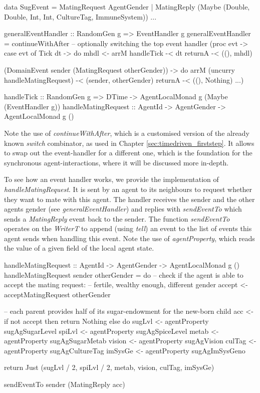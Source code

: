 \begin{HaskellCode}
data SugEvent = MatingRequest AgentGender
              | MatingReply (Maybe (Double, Double, Int, Int, CultureTag, ImmuneSystem))
              ...
              
generalEventHandler :: RandomGen g => EventHandler g
generalEventHandler =
  continueWithAfter -- optionally switching the top event handler 
    (proc evt -> 
      case evt of 
        Tick dt -> do
          mhdl <- arrM handleTick -< dt
          returnA -< ((), mhdl)

        (DomainEvent sender (MatingRequest otherGender)) -> do
          arrM (uncurry handleMatingRequest) -< (sender, otherGender)
          returnA -< ((), Nothing)
        ...)
        
handleTick :: RandomGen g => DTime -> AgentLocalMonad g (Maybe (EventHandler g))
handleMatingRequest :: AgentId -> AgentGender -> AgentLocalMonad g ()
\end{HaskellCode}

Note the use of \textit{continueWithAfter}, which is a customised version of the already known \textit{switch} combinator, as used in Chapter \ref{sec:timedriven_firststep}. It allows to swap out the event-handler for a different one, which is the foundation for the synchronous agent-interactions, where it will be discussed more in-depth.

To see how an event handler works, we provide the implementation of \textit{handleMatingRequest}. It is sent by an agent to its neighbours to request whether they want to mate with this agent. The handler receives the sender and the other agents gender (see \textit{generalEventHandler}) and replies with \textit{sendEventTo} which sends a \textit{MatingReply} event back to the sender. The function \textit{sendEventTo} operates on the \textit{WriterT} to append (using \textit{tell}) an event to the list of events this agent sends when handling this event. Note the use of \textit{agentProperty}, which reads the value of a given field of the local agent state. 

\begin{HaskellCode}
handleMatingRequest :: AgentId
                    -> AgentGender
                    -> AgentLocalMonad g ()
handleMatingRequest sender otherGender = do
  -- check if the agent is able to accept the mating request: 
  -- fertile, wealthy enough, different gender
  accept <- acceptMatingRequest otherGender

  -- each parent provides half of its sugar-endowment for the new-born child
  acc <- if not accept
      then return Nothing
      else do
        sugLvl  <- agentProperty sugAgSugarLevel
        spiLvl  <- agentProperty sugAgSpiceLevel
        metab   <- agentProperty sugAgSugarMetab
        vision  <- agentProperty sugAgVision
        culTag  <- agentProperty sugAgCultureTag
        imSysGe <- agentProperty sugAgImSysGeno

        return Just (sugLvl / 2, spiLvl / 2, metab, vision, culTag, imSysGe)

  sendEventTo sender (MatingReply acc)
\end{HaskellCode}

